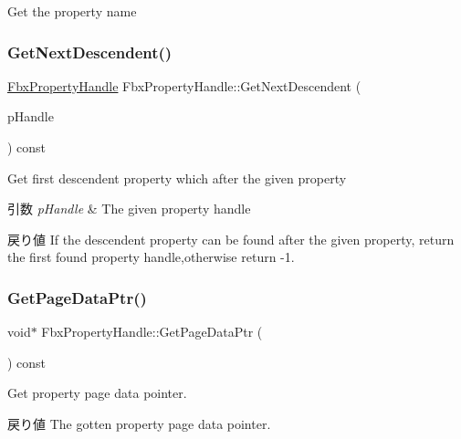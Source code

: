 Get the property name 

\mbox{\label{class_fbx_property_handle_a9285a1cf6dbf3854335a0a05eaf1d95f}} 
\subsubsection{\texorpdfstring{Get\+Next\+Descendent()}{GetNextDescendent()}}
{\footnotesize\ttfamily \hyperlink{class_fbx_property_handle}{Fbx\+Property\+Handle} Fbx\+Property\+Handle\+::\+Get\+Next\+Descendent (\begin{DoxyParamCaption}\item[{const \hyperlink{class_fbx_property_handle}{Fbx\+Property\+Handle} \&}]{p\+Handle }\end{DoxyParamCaption}) const}

Get first descendent property which after the given property 
\begin{DoxyParams}{引数}
{\em p\+Handle} & The given property handle \\
\hline
\end{DoxyParams}
\begin{DoxyReturn}{戻り値}
If the descendent property can be found after the given property, return the first found property handle,otherwise return -\/1. 
\end{DoxyReturn}
\mbox{\label{class_fbx_property_handle_a477ba4c610b36333701547d8aff9fa48}} 
\subsubsection{\texorpdfstring{Get\+Page\+Data\+Ptr()}{GetPageDataPtr()}}
{\footnotesize\ttfamily void$\ast$ Fbx\+Property\+Handle\+::\+Get\+Page\+Data\+Ptr (\begin{DoxyParamCaption}{ }\end{DoxyParamCaption}) const}

Get property page data pointer. \begin{DoxyReturn}{戻り値}
The gotten property page data pointer. 
\end{DoxyReturn}
\mbox{\label{class_fbx_property_handle_a10599909c3fc0a5bdfba5b7dc05f8ec6}} 
